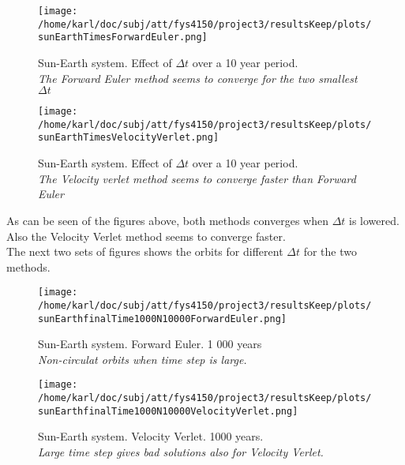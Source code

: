 \documentclass{article}
\begin{document}
\begin{minipage}{.49\textwidth} 
	\begin{figure}[H]
		\centering
		\texttt{[image: /home/karl/doc/subj/att/fys4150/project3/resultsKeep/plots/sunEarthTimesForwardEuler.png]}
		\caption{Sun-Earth system. Effect of $\Delta t$ over a 10 year period. \\ \textit{The Forward Euler method seems to converge for the two smallest $\Delta t$}}
		\label{1}
	\end{figure}
\end{minipage}\hfill
\begin{minipage}{.49\textwidth} 
	\begin{figure}[H]
		\centering
		\texttt{[image: /home/karl/doc/subj/att/fys4150/project3/resultsKeep/plots/sunEarthTimesVelocityVerlet.png]}
		\caption{Sun-Earth system. Effect of $\Delta t$ over a 10 year period. \\ \textit{The Velocity verlet method seems to converge faster than Forward Euler}}
		\label{1}
	\end{figure}
\end{minipage}\hfill
\vspace{2ex}

As can be seen of the figures above, both methods converges when $\Delta t$ is lowered.  Also the Velocity Verlet method seems to converge faster.\\

The next two sets of figures shows the orbits for different $\Delta t$ for the two methods.

\begin{minipage}{.49\textwidth} 
	\begin{figure}[H]
		\centering
		\texttt{[image: /home/karl/doc/subj/att/fys4150/project3/resultsKeep/plots/sunEarthfinalTime1000N10000ForwardEuler.png]}
		\caption{Sun-Earth system. Forward Euler. 1 000 years \\ \textit{Non-circulat orbits when time step is large.}}
		\label{1}
	\end{figure}
\end{minipage}\hfill
\begin{minipage}{.49\textwidth} 
	\begin{figure}[H]
		\centering
		\texttt{[image: /home/karl/doc/subj/att/fys4150/project3/resultsKeep/plots/sunEarthfinalTime1000N10000VelocityVerlet.png]}
		\caption{Sun-Earth system. Velocity Verlet. 1000 years. \\ \textit{Large time step gives bad solutions also for Velocity Verlet.}}
		\label{1}
	\end{figure}
\end{minipage}\hfill
\vspace{2ex}
\end{document}
